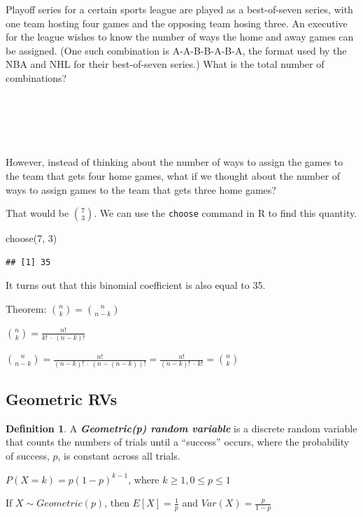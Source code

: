 \documentclass[
  11pt,
]{book}
\newenvironment{Shaded}{\begin{snugshade}}{\end{snugshade}}
\newcommand{\DecValTok}[1]{\textcolor[rgb]{0.00,0.00,0.81}{#1}}
\newcommand{\FunctionTok}[1]{\textcolor[rgb]{0.00,0.00,0.00}{#1}}
\newcommand{\NormalTok}[1]{#1}
\theoremstyle{definition}
\newtheorem{definition}{Definition}[chapter]
\theoremstyle{definition}
\theoremstyle{definition}
\theoremstyle{definition}
\theoremstyle{remark}
\begin{document}
Playoff series for a certain sports league are played as a best-of-seven series, with one team hosting four games and the opposing team hosing three. An executive for the league wishes to know the number of ways the home and away games can be assigned. (One such combination is A-A-B-B-A-B-A, the format used by the NBA and NHL for their best-of-seven series.) What is the total number of combinations?\\
\strut \\
\strut \\
\strut \\

However, instead of thinking about the number of ways to assign the games to the team that gets four home games, what if we thought about the number of ways to assign games to the team that gets three home games?

That would be \(\binom{7}{3}\). We can use the \texttt{choose} command in R to find this quantity.

\begin{Shaded}
\begin{Highlighting}[]
\FunctionTok{choose}\NormalTok{(}\DecValTok{7}\NormalTok{, }\DecValTok{3}\NormalTok{)}
\end{Highlighting}
\end{Shaded}

\begin{verbatim}
## [1] 35
\end{verbatim}

It turns out that this binomial coefficient is also equal to 35.

Theorem: \(\binom{n}{k} = \binom{n}{n-k}\)

\(\binom{n}{k} = \frac{n!}{k!\ \cdot\ (n-k)!}\)

\(\binom{n}{n-k} = \frac{n!}{(n-k)!\ \cdot\ (n-(n-k))!} = \frac{n!}{(n-k)!\ \cdot\ k!} = \binom{n}{k}\)

\hypertarget{geometric-rvs}{%
\subsection{Geometric RVs}\label{geometric-rvs}}

\begin{definition}
A \textbf{\emph{Geometric(p) random variable}} is a discrete random variable that counts the numbers of trials until a ``success'' occurs, where the probability of success, \(p\), is constant across all trials.

\(P(X=k) = p(1-p)^{k-1}\), where \(k \geq 1, 0 \leq p \leq 1\)

If \(X \sim Geometric(p)\), then \(E[X]=\frac{1}{p}\) and \(Var(X)=\frac{p}{1-p}\)
\end{definition}
\end{document}
